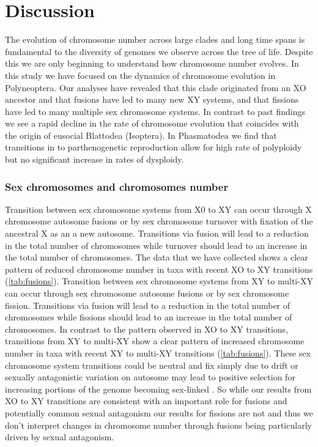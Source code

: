 \section{Discussion}
The evolution of chromosome number across large clades and long time spans is fundamental to the diversity of genomes we observe across the tree of life.
Despite this we are only beginning to understand how chromosome number evolves.
In this study we have focused on the dynamics of chromosome evolution in Polyneoptera. 
Our analyses have revealed that this clade originated from an XO ancestor and that fusions have led to many new XY systems, and that fissions have led to many multiple sex chromosome systems.
In contrast to past findings \citep{ross2015} we see a rapid decline in the rate of chromosome evolution that coincides with the origin of eusocial Blattodea (Isoptera).
In Phasmatodea we find that transitions in to parthenogenetic reproduction allow for high rate of polyploidy but no significant increase in rates of dysploidy.

\subsubsection{Sex chromosomes and chromosomes number}

Transition between sex chromosome systems from X0 to XY can occur through X chromosome autosome fusions or by sex chromosome turnover with fixation of the ancestral X as an a new autosome.
Transitions via fusion will lead to a reduction in the total number of chromosomes while turnover should lead to an increase in the total number of chromosomes.
The data that we have collected shows a clear pattern of reduced chromosome number in taxa with recent XO to XY transitions (\cref{tab:fusions}).
Transition between sex chromosome systems from XY to multi-XY can occur through sex chromosome autosome fusions or by sex chromosome fission.
Transitions via fusion will lead to a reduction in the total number of chromosomes while fissions should lead to an increase in the total number of chromosomes.
In contrast to the pattern observed in XO to XY transitions, transitions from XY to multi-XY show a clear pattern of increased chromosome number in taxa with recent XY to multi-XY transitions (\cref{tab:fusions}).
These sex chromosome system transitions could be neutral and fix simply due to drift or sexually antagonistic variation on autosome may lead to positive selection for increasing portions of the genome becoming sex-linked \citep{charlesworth1980, kitano2012}.
So while our results from XO to XY transitions are consistent with an important role for fusions and potentially common sexual antagonism our results for fissions are not and thus we don't interpret changes in chromosome number through fusions being particularly driven by sexual antagonism. 

